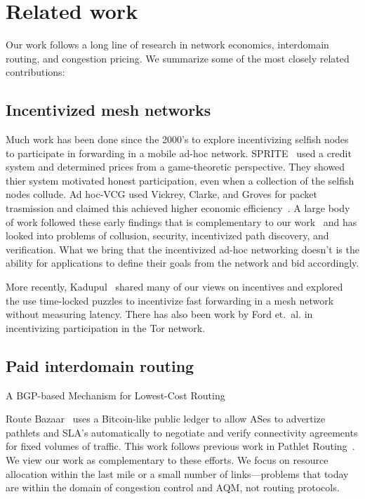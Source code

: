 \section{Related work}
\label{sec:related}

Our work follows a long line of research in network economics,
interdomain routing, and congestion pricing.  We summarize some of the
most closely related contributions:

\subsection{Incentivized mesh networks}
Much work has been done since the 2000's to explore incentivizing selfish nodes to participate in forwarding in a mobile ad-hoc network.
SPRITE~\cite{zhong03} used a credit system and determined prices from a game-theoretic perspective. They showed thier system motivated honest participation, even when a collection of the selfish nodes collude. Ad hoc-VCG used Vickrey, Clarke, and Groves for packet trasmission and claimed this achieved higher economic efficiency~\cite{anderegg03}.
A large body of work followed these early findings that is complementary to our work~\cite{buttyan03,chen04, chen05, wang06, demir07,zhong07, kargar08, zhu08, eidenbenz08, wu10, zhong10, martignon11, martignon15, chen13} and has looked into problems of collusion, security, incentivized path discovery, and verification. What we bring that the incentivized ad-hoc networking doesn't is the ability for applications to define their goals from the network and bid accordingly.

More recently, Kadupul~\cite{kadupul15} shared many of our views on incentives and explored the use time-locked puzzles to incentivize fast forwarding in a mesh network without measuring latency.
There has also been work by Ford et.~al. in incentivizing participation in the Tor network\cite{torpath14, onions14}.

\subsection{Paid interdomain routing}
A BGP-based Mechanism for Lowest-Cost Routing \cite{feigenbaum05}

Route Bazaar~\cite{routebazaar15} uses a Bitcoin-like public ledger to
allow ASes to advertize pathlets and SLA's automatically to negotiate
and verify connectivity agreements for fixed volumes of traffic. This
work follows previous work in Pathlet Routing~\cite{pathlet09}. We
view our work as complementary to these efforts. We focus on resource
allocation within the last mile or a small number of links---problems
that today are within the domain of congestion control and AQM, not
routing protocols.


